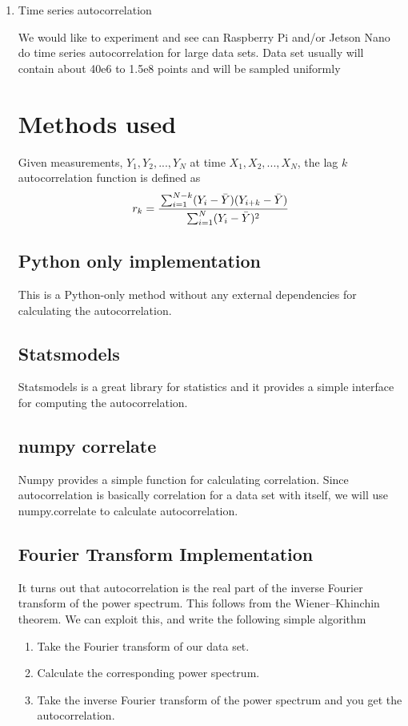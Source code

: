 \documentclass[10pt, onecolumn]{article}
\title{\mytitle}
\author{\myauthor\hspace{1em}\\\contact\\FWC22098-FWC22090 -\hspace{0.5em}IITH\hspace{0.5em}\mymodule\hspace{6em}}
\begin{document}
\maketitle
\begin{enumerate}
\section{Abstract}
\item[\textbf{}] Time series autocorrelation

We would like to experiment and see can Raspberry Pi and/or Jetson Nano do time series autocorrelation for large data sets. Data set usually will contain about 40e6 to 1.5e8 points and will be sampled uniformly

\section{Methods used}
Given measurements, $Y_1, Y_2, ..., Y_N$ at time $X_1, X_2, ..., X_N$, the lag $k$ autocorrelation function is defined as
		\[ r_k = \cfrac{\sum_{i=1}^{N-k}(Y_i-\bar{Y})(Y_{i+k}-\bar{Y})}{\sum_{i=1}^N(Y_i-\bar{Y})^2} \]
\subsection{Python only implementation}
This is a Python-only method without any external dependencies for calculating the autocorrelation.
\subsection{Statsmodels}
Statsmodels is a great library for statistics and it provides a simple interface for computing the autocorrelation.
\subsection{numpy correlate}
Numpy provides a simple function for calculating correlation. Since autocorrelation is basically correlation for a data set with itself, we will use numpy.correlate to calculate autocorrelation.
\subsection{Fourier Transform Implementation}
It turns out that autocorrelation is the real part of the inverse Fourier transform of the power spectrum. This follows from the Wiener–Khinchin theorem. We can exploit this, and write the following simple algorithm
\begin{enumerate}
\item Take the Fourier transform of our data set.
\item Calculate the corresponding power spectrum.  
\item Take the inverse Fourier transform of the power spectrum and you get the autocorrelation.
\end{enumerate}

\end{enumerate}
\end{document}

